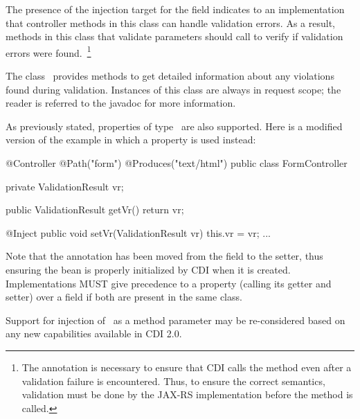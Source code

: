 The presence of the injection target for the field 
 indicates to an implementation that controller methods in this
class can handle validation errors. As a result, methods in this class
that validate parameters should call  to verify if
validation errors were found.~\footnote{The  
annotation is necessary to ensure that CDI calls the method even after 
a validation failure is encountered. Thus, to ensure the correct semantics, 
validation  must be done by the JAX-RS implementation before the method 
is called.}

The class \ValRes\ provides methods to get detailed information about any violations 
found during validation. Instances of this class are always in request
scope; the reader is referred to the javadoc for more information.

As previously stated, properties of type \ValRes\
are also supported. Here is a modified version of the example in which
a property is used instead:

\begin{listing}{1}
@Controller
@Path("form")
@Produces("text/html")
public class FormController {

    private ValidationResult vr;
    
    public ValidationResult getVr() {
        return vr;
    }

    @Inject
    public void setVr(ValidationResult vr) {
        this.vr = vr;
    }
    ...
}
\end{listing}

Note that the  annotation has been moved from the field to the setter,
thus ensuring the bean is properly initialized by CDI when it is
created. Implementations MUST give precedence to a property (calling its getter and
setter) over a field if both are present in the same class.
 
\begin{ednote}
Support for injection of \ValRes\ as a method parameter may be re-considered based on 
any new capabilities available in CDI 2.0.
\end{ednote}
